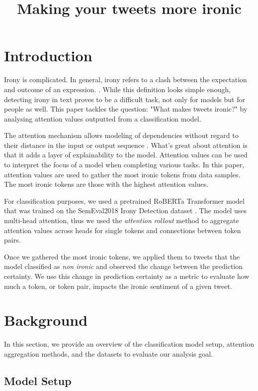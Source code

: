 \documentclass[10pt, a4paper]{article}
\title{Making your tweets more ironic}
\begin{document}
\maketitleabstract

\section{Introduction}

Irony is complicated.
In general, irony refers to a clash between the expectation and outcome of an expression. \citep{kreutz-20}. 
While this definition looks simple enough, detecting irony in text proves to be a difficult task, not only for models but for people as well.
This paper tackles the question: "What makes tweets ironic?" by analysing attention values outputted from a classification model.

The attention mechanism allows modeling of dependencies without regard to their distance in the input or output sequence \citep{all-you-need}.
What's great about attention is that it adds a layer of explainability to the model. Attention values can be used to interpret the focus of a model when completing various tasks.
In this paper, attention values are used to gather the most ironic tokens from data samples. The most ironic tokens are those with the highest attention values.

For classification purposes, we used a pretrained RoBERTa Transformer model that was trained on the SemEval2018 Irony Detection dataset \citep{roberta}.
The model uses multi-head attention, thus we used the \textit{attention rollout} method to aggregate attention values across heads for single tokens and connections between token pairs.

Once we gathered the most ironic tokens, we applied them to tweets that the model classified as \textit{non ironic} and observed the change between the prediction certainty.
We use this change in prediction certainty as a metric to evaluate how much a token, or token pair, impacts the ironic sentiment of a given tweet.

\section{Background}

In this section, we provide an overview of the classification model setup, attention aggregation methods, and the datasets to evaluate our analysis goal.

\subsection{Model Setup}
\label{sec:first}
\end{document}

